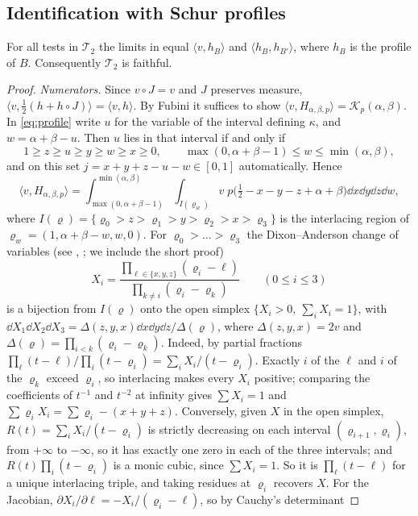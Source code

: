 \documentclass[11pt,colorlinks]{charlie}
\newcommand{\ip}[2]{\langle #1,#2\rangle}
\begin{document}
\subsection{Identification with Schur profiles}
\begin{lemma}[Bridge]\label{lem:bridge}
For all tests in $\mathcal T_2$ the limits in  equal $\ip{v}{h_B}$ and $\ip{h_B}{h_{B'}}$, where $h_B$ is the profile of $B$. Consequently $\mathcal T_2$ is faithful.
\end{lemma}
\begin{proof}
\emph{Numerators.} Since $v\circ J=v$ and $J$ preserves measure, $\ip{v}{\frac12(h+h\circ J)}=\ip vh$. By Fubini it suffices to show $\ip{v}{H_{\alpha,\beta,p}}=\mathcal K_p(\alpha,\beta)$. In \eqref{eq:profile} write $u$ for the variable of the interval defining $\kappa$, and $w=\alpha+\beta-u$. Then $u$ lies in that interval if and only if
\[
 1\ge z\ge u\ge y\ge w\ge x\ge0,\qquad \max(0,\alpha+\beta-1)\le w\le\min(\alpha,\beta),
\]
and on this set $j=x+y+z-u-w\in[0,1]$ automatically. Hence
\[
 \ip{v}{H_{\alpha,\beta,p}}=\int_{\max(0,\alpha+\beta-1)}^{\min(\alpha,\beta)}\int_{I(\varrho_w)}v\;p\big(\tfrac12-x-y-z+\alpha+\beta\big)\dd x\dd y\dd z\dd w,
\]
where $I(\varrho)=\{\varrho_0>z>\varrho_1>y>\varrho_2>x>\varrho_3\}$ is the interlacing region of $\varrho_w=(1,\alpha+\beta-w,w,0)$. For $\varrho_0>\dots>\varrho_3$ the Dixon--Anderson change of variables (see \cite{Anderson}, \cite[\S4.2]{Forrester}; we include the short proof)
\[
 X_i=\frac{\prod_{\ell\in\{x,y,z\}}(\varrho_i-\ell)}{\prod_{k\ne i}(\varrho_i-\varrho_k)}\qquad(0\le i\le3)
\]
is a bijection from $I(\varrho)$ onto the open simplex $\{X_i>0,\ \sum_iX_i=1\}$, with $\dd X_1\dd X_2\dd X_3=\Delta(z,y,x)\dd x\dd y\dd z/\Delta(\varrho)$, where $\Delta(z,y,x)=2v$ and $\Delta(\varrho)=\prod_{i<k}(\varrho_i-\varrho_k)$. Indeed, by partial fractions $\prod_\ell(t-\ell)/\prod_i(t-\varrho_i)=\sum_iX_i/(t-\varrho_i)$. Exactly $i$ of the $\ell$ and $i$ of the $\varrho_k$ exceed $\varrho_i$, so interlacing makes every $X_i$ positive; comparing the coefficients of $t^{-1}$ and $t^{-2}$ at infinity gives $\sum X_i=1$ and $\sum\varrho_iX_i=\sum\varrho_i-(x+y+z)$. Conversely, given $X$ in the open simplex, $R(t)=\sum_iX_i/(t-\varrho_i)$ is strictly decreasing on each interval $(\varrho_{i+1},\varrho_i)$, from $+\infty$ to $-\infty$, so it has exactly one zero in each of the three intervals; and $R(t)\prod_i(t-\varrho_i)$ is a monic cubic, since $\sum X_i=1$. So it is $\prod_\ell(t-\ell)$ for a unique interlacing triple, and taking residues at $\varrho_i$ recovers $X$. For the Jacobian, $\partial X_i/\partial\ell=-X_i/(\varrho_i-\ell)$, so by Cauchy's determinant

\end{proof}
\end{document}
